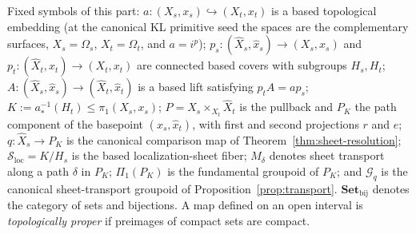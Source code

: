 Fixed symbols of this part:
\( a\colon(X_s,x_s)\hookrightarrow(X_t,x_t) \) is a based topological
embedding (at the canonical KL primitive seed the spaces are the
complementary surfaces, \( X_s=\Omega_s \), \( X_t=\Omega_t \), and
\( a=i^{p} \));
\( p_s\colon(\widehat X_s,\widehat x_s)\to(X_s,x_s) \) and
\( p_t\colon(\widehat X_t,\widehat x_t)\to(X_t,x_t) \) are connected based
covers with subgroups \( H_s,H_t \);
\( A\colon(\widehat X_s,\widehat x_s)\to(\widehat X_t,\widehat x_t) \) is a
based lift satisfying \( p_tA=ap_s \);
\( K:=a_*^{-1}(H_t)\leq\pi_1(X_s,x_s) \);
\( P=X_s\times_{X_t}\widehat X_t \) is the pullback and \( P_K \) the path
component of the basepoint \( (x_s,\widehat x_t) \), with first and second
projections \( r \) and \( e \);
\( q\colon\widehat X_s\to P_K \) is the canonical comparison map of
Theorem~\ref{thm:sheet-resolution};
\( \mathcal S_{\mathrm{loc}}=K/H_s \) is the based localization-sheet
fiber;
\( M_\delta \) denotes sheet transport along a path \( \delta \) in
\( P_K \); \( \Pi_1(P_K) \) is the fundamental groupoid of \( P_K \); and
\( \mathcal G_q \) is the canonical sheet-transport groupoid of
Proposition~\ref{prop:transport}.  \( \mathbf{Set}_{\mathrm{bij}} \)
denotes the category of sets and bijections.  A map defined on an open
interval is \emph{topologically proper} if preimages of compact sets are
compact.

